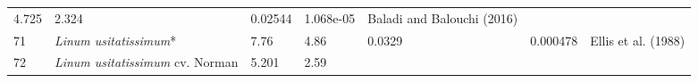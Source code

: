 \documentclass[]{article}
\begin{document}
\begin{longtable}[]{@{}lllllll@{}}
\begin{minipage}[t]{0.05\columnwidth}
4.725\strut
\end{minipage} & \begin{minipage}[t]{0.08\columnwidth}\raggedright
2.324\strut
\end{minipage} & \begin{minipage}[t]{0.08\columnwidth}\raggedright
0.02544\strut
\end{minipage} & \begin{minipage}[t]{0.08\columnwidth}\raggedright
1.068e-05\strut
\end{minipage} & \begin{minipage}[t]{0.23\columnwidth}\raggedright
Baladi and Balouchi (2016)\strut
\end{minipage}\tabularnewline
\begin{minipage}[t]{0.05\columnwidth}\raggedright
71\strut
\end{minipage} & \begin{minipage}[t]{0.23\columnwidth}\raggedright
\emph{Linum usitatissimum}*\strut
\end{minipage} & \begin{minipage}[t]{0.05\columnwidth}\raggedright
7.76\strut
\end{minipage} & \begin{minipage}[t]{0.08\columnwidth}\raggedright
4.86\strut
\end{minipage} & \begin{minipage}[t]{0.08\columnwidth}\raggedright
0.0329\strut
\end{minipage} & \begin{minipage}[t]{0.08\columnwidth}\raggedright
0.000478\strut
\end{minipage} & \begin{minipage}[t]{0.23\columnwidth}\raggedright
Ellis et al. (1988)\strut
\end{minipage}\tabularnewline
\begin{minipage}[t]{0.05\columnwidth}\raggedright
72\strut
\end{minipage} & \begin{minipage}[t]{0.23\columnwidth}\raggedright
\emph{Linum usitatissimum }cv. Norman\strut
\end{minipage} & \begin{minipage}[t]{0.05\columnwidth}\raggedright
5.201\strut
\end{minipage} & \begin{minipage}[t]{0.08\columnwidth}\raggedright
2.59\strut
\end{minipage} & \begin{minipage}[t]{0.08\columnwidth}\raggedright

\end{minipage}
\end{longtable}
\end{document}
